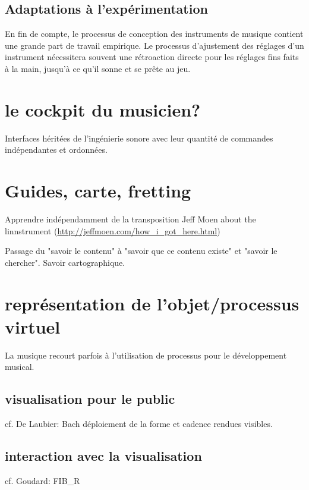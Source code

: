 \subsection{Adaptations à l'expérimentation}
En fin de compte, le processus de conception des instruments de musique contient une grande part de travail empirique. Le processus d'ajustement des réglages d'un instrument nécessitera souvent une rétroaction directe pour les réglages fins faits à la main, jusqu'à ce qu'il sonne et se prête au jeu.


\section{le cockpit du musicien?}
\label{sec:visual_representation:sec1}
\cite{vertegaal_towards_1996}
Interfaces héritées de l'ingénierie sonore avec leur quantité de commandes indépendantes et ordonnées.

\section{Guides, carte, fretting}

Apprendre indépendamment de la transposition
 Jeff Moen about the linnstrument (\url{http://jeffmoen.com/how_i_got_here.html})

Passage du "savoir le contenu" à "savoir que ce contenu existe" et "savoir le chercher".
Savoir cartographique.

\section{représentation de l'objet/processus virtuel}
La musique recourt parfois à l'utilisation de processus pour le développement musical. 
\subsection{visualisation pour le public}
cf. De Laubier: Bach déploiement de la forme et cadence rendues visibles.

\subsection{interaction avec la visualisation}
cf. Goudard: FIB\_R

